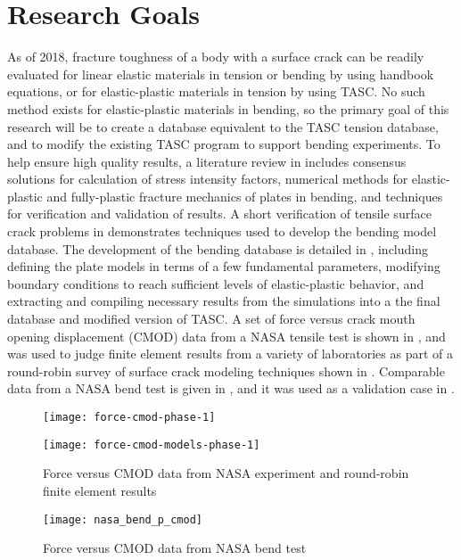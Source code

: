 \section{Research Goals}
\label{sec:research-goals}

As of 2018, fracture toughness of a body with a surface crack can be readily evaluated for linear elastic materials in tension or bending by using handbook equations, or for elastic-plastic materials in tension by using TASC.
No such method exists for elastic-plastic materials in bending, so the primary goal of this research will be to create a database equivalent to the TASC tension database, and to modify the existing TASC program to support bending experiments.
To help ensure high quality results, a literature review in  includes consensus solutions for calculation of stress intensity factors, numerical methods for elastic-plastic and fully-plastic fracture mechanics of plates in bending, and techniques for verification and validation of results.
A short verification of tensile surface crack problems in  demonstrates techniques used to develop the bending model database.
The development of the bending database is detailed in , including defining the plate models in terms of a few fundamental parameters, modifying boundary conditions to reach sufficient levels of elastic-plastic behavior, and extracting and compiling necessary results from the simulations into a the final database and modified version of TASC.
A set of force versus crack mouth opening displacement (CMOD) data from a NASA tensile test is shown in , and was used to judge finite element results from a variety of laboratories as part of a round-robin survey of surface crack modeling techniques shown in  \citep{wells2012analytical}.
Comparable data from a NASA bend test \cite{allen2018} is given in , and it was used as a validation case in .
\begin{sidewaysfigure}
\centering
\begin{minipage}[b]{0.45\textwidth}
\centering
\texttt{[image: force-cmod-phase-1]}
\end{minipage}%
\begin{minipage}[b]{0.55\textwidth}
\centering
\texttt{[image: force-cmod-models-phase-1]}
\end{minipage}
\caption[Force versus CMOD data from NASA experiment and round-robin finite element results]{Force versus CMOD data from NASA experiment and round-robin finite element results \citep{wells2012analytical}}
\end{sidewaysfigure}
\begin{figure}
\centering
\texttt{[image: nasa\_bend\_p\_cmod]}
\caption{\label{fig:nasa-bend-p-cmod} Force versus CMOD data from NASA bend test}
\end{figure}

